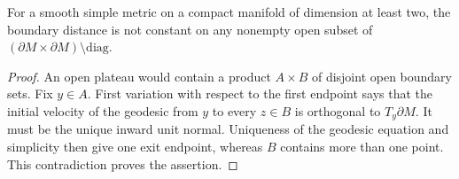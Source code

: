 \begin{lemma}
\label{lem:v86-no-plateau}
For a smooth simple metric on a compact manifold of dimension at least
two, the boundary distance is not constant on any nonempty open subset
of $(\partial M\times\partial M)\setminus\mathrm{diag}$.
\end{lemma}
\begin{proof}
An open plateau would contain a product $A\times B$ of disjoint open
boundary sets. Fix $y\in A$. First variation with respect to the first
endpoint says that the initial velocity of the geodesic from $y$ to
every $z\in B$ is orthogonal to $T_y\partial M$. It must be the unique
inward unit normal. Uniqueness of the geodesic equation and simplicity
then give one exit endpoint, whereas $B$ contains more than one point.
This contradiction proves the assertion.
\end{proof}

